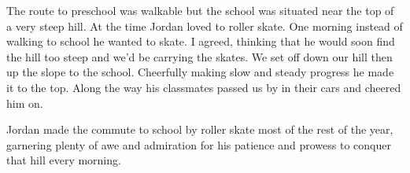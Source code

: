 \begin{window}
\smallskip
\end{window}
The route to preschool was walkable but the school was situated near the top of
a very steep hill. At the time Jordan loved to roller skate. One morning
instead of walking to school he wanted to skate. I agreed, thinking that he
would soon find the hill too steep and we'd be carrying the skates.  We set off
down our hill then up the slope to the school. Cheerfully making slow and
steady progress he made it to the top. Along the way his classmates passed us
by in their cars and cheered him on.

Jordan made the commute to school by roller skate most of the rest of the year,
garnering plenty of awe and admiration for his patience and prowess to conquer
that hill every morning.

